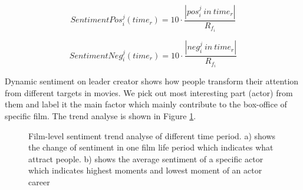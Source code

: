 \begin{equation}
    SentimentPos^j_i (time_r) = 10\cdot \frac{|pos^j_i \ in \ time_r|}{R_{f_i}}
\end{equation}

\begin{equation}
    SentimentNeg^j_i (time_r) = 10\cdot \frac{|neg^j_i \ in \ time_r|}{R_{f_i}}
\end{equation}

\par Dynamic sentiment on leader creator shows how people transform their attention from different targets in movies. We pick out most interesting part (actor) from them and label it the main factor which mainly contribute to the box-office of specific film. The trend analyse is shown in Figure \ref{fig:sentiment}.

\begin{figure}[!htbp]
\centering
{}
\hfill
{}
\caption{Film-level sentiment trend analyse of different time period. a) shows the change of sentiment in one film life period which indicates what attract people. b) shows the average sentiment of a specific actor which indicates highest moments and lowest moment of an actor career }
\label{fig:sentiment}
\end{figure}


